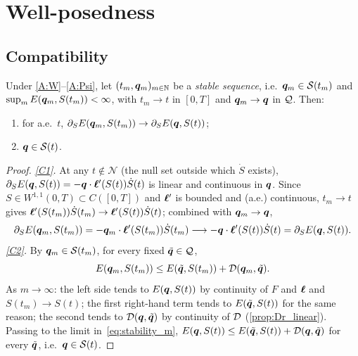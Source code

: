 
\section{Well-posedness}
\label{app:math}

\subsection{Compatibility}

\begin{lemma}\label{lem:compatibility}
Under \ref{A:W}--\ref{A:Psi}, let $(t_m,\bm{q}_m)_{m\in\mathbb{N}}$ be a
\emph{stable sequence}, i.e.\ $\bm{q}_m\in\mathcal S(t_m)$ and
$\sup_m E(\bm{q}_m,S(t_m))<\infty$, with $t_m\to t$ in $[0,T]$ and
$\bm{q}_m\to\bm{q}$ in $\mathcal{Q}$. Then:
\begin{enumerate}[label=\textnormal{(C\arabic*)},leftmargin=2.6em,itemsep=2pt]
  \item\label{C1} for a.e.\ $t$, $\partial_S E(\bm{q}_m,S(t_m))\to\partial_S E(\bm{q},S(t))$;
  \item\label{C2} $\bm{q}\in\mathcal S(t)$.
\end{enumerate}
\end{lemma}

\begin{proof}
\emph{\ref{C1}.} At any $t\notin\mathcal N$ (the null set outside which
$\dot S$ exists), $\partial_S E(\bm{q},S(t))=-\bm{q}\cdot\bm{\ell}'(S(t))\dot S(t)$
is linear and continuous in $\bm{q}$. Since $S\in W^{1,1}(0,T)\subset C([0,T])$
and $\bm{\ell}'$ is bounded and (a.e.) continuous, $t_m\to t$ gives
$\bm{\ell}'(S(t_m))\dot S(t_m)\to\bm{\ell}'(S(t))\dot S(t)$; combined with
$\bm{q}_m\to\bm{q}$,
\[
  \partial_S E(\bm{q}_m,S(t_m))=-\bm{q}_m\cdot\bm{\ell}'(S(t_m))\dot S(t_m)
  \longrightarrow-\bm{q}\cdot\bm{\ell}'(S(t))\dot S(t)=\partial_S E(\bm{q},S(t)).
\]
\emph{\ref{C2}.} By $\bm{q}_m\in\mathcal S(t_m)$, for every fixed
$\tilde{\bm{q}}\in\mathcal{Q}$,
\begin{equation}\label{eq:stability_m}
  E(\bm{q}_m,S(t_m))\le E(\tilde{\bm{q}},S(t_m))+\mathcal{D}(\bm{q}_m,\tilde{\bm{q}}).
\end{equation}
As $m\to\infty$: the left side tends to $E(\bm{q},S(t))$ by continuity of
$F$ and $\bm{\ell}$ and $S(t_m)\to S(t)$; the first right-hand term tends
to $E(\tilde{\bm{q}},S(t))$ for the same reason; the second tends to
$\mathcal{D}(\bm{q},\tilde{\bm{q}})$ by continuity of $\mathcal{D}$
(\cref{prop:Dr_linear}). Passing to the limit in~\eqref{eq:stability_m},
$E(\bm{q},S(t))\le E(\tilde{\bm{q}},S(t))+\mathcal{D}(\bm{q},\tilde{\bm{q}})$ for
every $\tilde{\bm{q}}$, i.e.\ $\bm{q}\in\mathcal S(t)$.
\end{proof}


